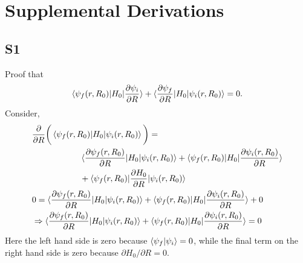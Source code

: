 \section{Supplemental Derivations}

\subsection{S1}
Proof that
\begin{align}
    \braket{\psi_f(r,R_0)|H_0|\frac{\partial \psi_i}{\partial R}}
    + \braket{\frac{\partial \psi_f}{\partial R}|H_0 |\psi_i(r,R_0)}  =  0 .
\end{align}
Consider,
\begin{align}
    & \frac{\partial}{\partial R}\bigg(\braket{\psi_f(r,R_0)|H_0 |\psi_i(r,R_0)}\bigg) = \\
    & \hspace{2cm} \braket{\frac{\partial \psi_f(r,R_0)}{\partial R}|H_0 |\psi_i(r,R_0)}
    + \braket{\psi_f(r,R_0)|H_0 |\frac{\partial \psi_i(r,R_0)}{\partial R}} \nonumber \\
    & \hspace{2cm} + \braket{\psi_f(r,R_0)|\frac{\partial H_0}{\partial R} |\psi_i(r,R_0)} \nonumber \\
    & 0 = \braket{\frac{\partial \psi_f(r,R_0)}{\partial R}|H_0 |\psi_i(r,R_0)}
    + \braket{\psi_f(r,R_0)|H_0 |\frac{\partial \psi_i(r,R_0)}{\partial R}}
    + 0 \nonumber \\
    & \Rightarrow \braket{\frac{\partial \psi_f(r,R_0)}{\partial R}|H_0 |\psi_i(r,R_0)}
    + \braket{\psi_f(r,R_0)|H_0 |\frac{\partial \psi_i(r,R_0)}{\partial R}} = 0
\end{align}
Here the left hand side is zero because $\braket{\psi_{f}|\psi_{i}}=0$, while the final term on the right hand side is zero because $\partial H_0/\partial R = 0$.

